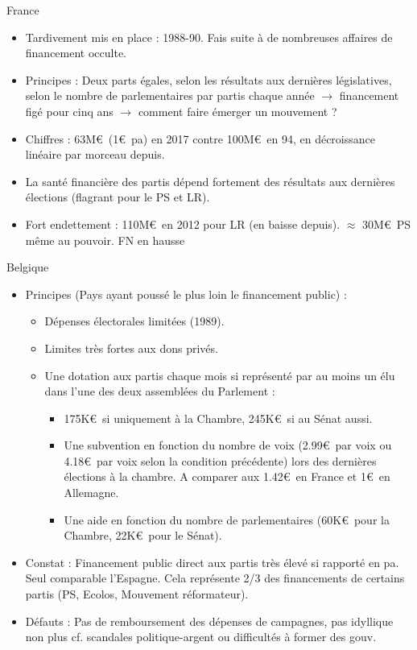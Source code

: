 \documentclass[10pt,t]{beamer}
\begin{document}
\begin{frame}{France}
    \begin{itemize}
        \item \alert{Tardivement mis en place} : 1988-90. Fais suite à de nombreuses affaires de financement occulte.
        \item \alert{Principes} : Deux parts égales, selon les résultats aux dernières législatives, selon le nombre de parlementaires par partis chaque année $\rightarrow$ financement figé pour cinq ans $\rightarrow$ comment faire émerger un mouvement ?
        \item \alert{Chiffres} : 63M\euro\ (1\euro\ pa) en 2017 contre 100M\euro\ en 94, en décroissance linéaire par morceau depuis.
        \item La santé financière des partis dépend fortement des résultats aux dernières élections (flagrant pour le PS et LR).
        \item \alert{Fort endettement} : 110M\euro\ en 2012 pour LR (en baisse depuis). $\approx$ 30M\euro\ PS même au pouvoir. FN en hausse
    \end{itemize}
\end{frame}

\begin{frame}{Belgique}
    \begin{itemize}
        \item \alert{Principes} (Pays ayant poussé le plus loin le financement public) :
        \begin{itemize}
            \item Dépenses électorales limitées (1989).
            \item Limites très fortes aux dons privés.
            \item Une dotation aux partis chaque mois si représenté par au moins un élu dans l'une des deux assemblées du Parlement :
            \begin{itemize}
                \item 175K\euro\ si uniquement à la Chambre, 245K\euro\ si au Sénat aussi.
                \item Une subvention en fonction du nombre de voix (2.99\euro\ par voix ou 4.18\euro\ par voix selon la condition précédente) lors des dernières élections à la chambre. A comparer aux 1.42\euro\ en France et 1\euro\ en Allemagne.
                \item Une aide en fonction du nombre de parlementaires (60K\euro\ pour la Chambre, 22K\euro\ pour le Sénat).
            \end{itemize}
        \end{itemize}
        \item \alert{Constat} : Financement public direct aux partis très élevé si rapporté en pa. Seul comparable l'Espagne. Cela représente 2/3 des financements de certains partis (PS, Ecolos, Mouvement réformateur).
        \item \alert{Défauts} : Pas de remboursement des dépenses de campagnes, pas idyllique non plus cf. scandales politique-argent ou difficultés à former des gouv.
    \end{itemize}
\end{frame}
\end{document}
